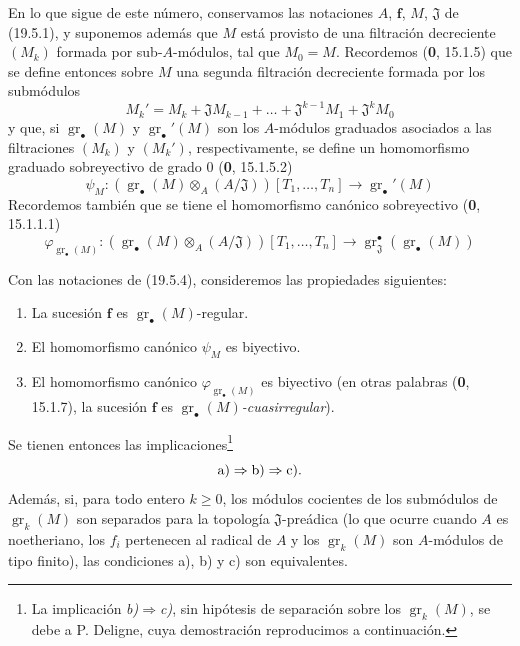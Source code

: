 \begin{env}[19.5.4]
\label{IV.19.5.4}
En lo que sigue de este número, conservamos las notaciones $A$, $\mathbf f$, $M$, $\mathfrak J$ de (19.5.1), y suponemos además que $M$ está provisto de una filtración decreciente $(M_k)$ formada por sub-$A$-módulos, tal que $M_0=M$. Recordemos (\textbf{0}, 15.1.5) que se define entonces sobre $M$ una segunda filtración decreciente formada por los submódulos
\[
  M_k'=M_k+\mathfrak JM_{k-1}+\ldots+\mathfrak J^{k-1}M_1+\mathfrak J^kM_0
\]
y que, si $\operatorname{gr}_\bullet(M)$ y $\operatorname{gr}_\bullet'(M)$ son los $A$-módulos graduados asociados a las filtraciones $(M_k)$ y $(M_k')$, respectivamente, se define un homomorfismo graduado sobreyectivo de grado $0$ (\textbf{0}, 15.1.5.2)
\[
  \psi_M:(\operatorname{gr}_\bullet(M)\otimes_A(A/\mathfrak J))[T_1,\ldots,T_n]\longrightarrow\operatorname{gr}_\bullet'(M)
\]
Recordemos también que se tiene el homomorfismo canónico sobreyectivo (\textbf{0}, 15.1.1.1)
\[
  \varphi_{\operatorname{gr}_\bullet(M)}:(\operatorname{gr}_\bullet(M)\otimes_A(A/\mathfrak J))[T_1,\ldots,T_n]\longrightarrow\operatorname{gr}_{\mathfrak J}^\bullet(\operatorname{gr}_\bullet(M))
\]
\end{env}

\begin{theorem}[19.5.5]
\label{IV.19.5.5}
Con las notaciones de \textup{(19.5.4)}, consideremos las propiedades siguientes:
\begin{enumerate}
  \item[\textup{a)}] La sucesión $\mathbf f$ es $\operatorname{gr}_\bullet(M)$-regular.
  \item[\textup{b)}] El homomorfismo canónico $\psi_M$ es biyectivo.
  \item[\textup{c)}] El homomorfismo canónico $\varphi_{\operatorname{gr}_\bullet(M)}$ es biyectivo \textup{(en otras palabras (\textbf{0}, 15.1.7), la sucesión $\mathbf f$ es $\operatorname{gr}_\bullet(M)$\emph{-cuasirregular})}.
\end{enumerate}


Se tienen entonces las implicaciones\footnote{La implicación \emph{b)}$\Rightarrow$\emph{c)}, sin hipótesis de separación sobre los $\operatorname{gr}_k(M)$, se debe a P. Deligne, cuya demostración reproducimos a continuación.}
\[
  \textup{a)}\Rightarrow\textup{b)}\Rightarrow\textup{c)}.
\]
Además, si, para todo entero $k\geq0$, los módulos cocientes de los submódulos de $\operatorname{gr}_k(M)$ son separados para la topología $\mathfrak J$-preádica \textup{(lo que ocurre cuando $A$ es noetheriano, los $f_i$ pertenecen al radical de $A$ y los $\operatorname{gr}_k(M)$ son $A$-módulos de tipo finito)}, las condiciones \textup{a)}, \textup{b)} y \textup{c)} son equivalentes.
\end{theorem}

